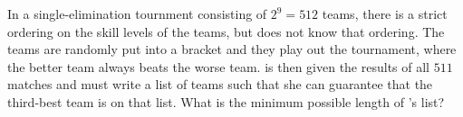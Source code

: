 In a single-elimination tournment consisting of $2^9 = 512$ teams, there is a strict ordering on the skill levels of the teams, but  does not know that ordering. The teams are randomly put into a bracket and they play out the tournament, where the better team always beats the worse team.  is then given the results of all $511$ matches and must write a list of teams such that she can guarantee that the third-best team is on that list. What is the minimum possible length of 's list?
